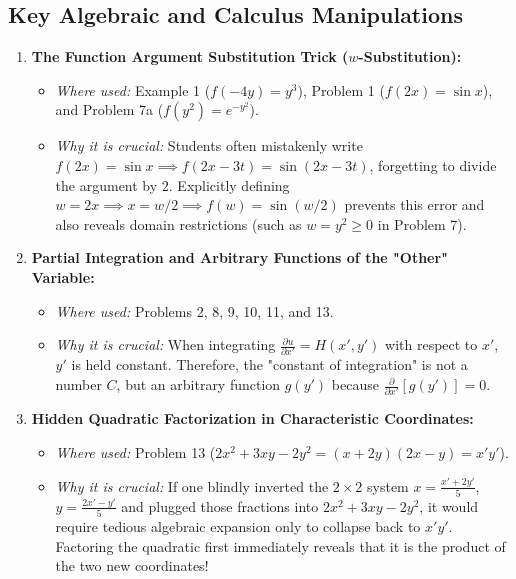 \documentclass[11pt]{article}
\begin{document}
\subsection{Key Algebraic and Calculus Manipulations}
\begin{enumerate}
    \item \textbf{The Function Argument Substitution Trick ($w$-Substitution):}
    \begin{itemize}
        \item \emph{Where used:} Example 1 ($f(-4y) = y^3$), Problem 1 ($f(2x) = \sin x$), and Problem 7a ($f(y^2) = e^{-y^2}$).
        \item \emph{Why it is crucial:} Students often mistakenly write $f(2x) = \sin x \implies f(2x - 3t) = \sin(2x - 3t)$, forgetting to divide the argument by $2$. Explicitly defining $w = 2x \implies x = w/2 \implies f(w) = \sin(w/2)$ prevents this error and also reveals domain restrictions (such as $w = y^2 \ge 0$ in Problem 7).
    \end{itemize}

    \item \textbf{Partial Integration and Arbitrary Functions of the "Other" Variable:}
    \begin{itemize}
        \item \emph{Where used:} Problems 2, 8, 9, 10, 11, and 13.
        \item \emph{Why it is crucial:} When integrating $\frac{\partial u}{\partial x'} = H(x', y')$ with respect to $x'$, $y'$ is held constant. Therefore, the "constant of integration" is not a number $C$, but an arbitrary function $g(y')$ because $\frac{\partial}{\partial x'}[g(y')] = 0$.
    \end{itemize}

    \item \textbf{Hidden Quadratic Factorization in Characteristic Coordinates:}
    \begin{itemize}
        \item \emph{Where used:} Problem 13 ($2x^2 + 3xy - 2y^2 = (x + 2y)(2x - y) = x'y'$).
        \item \emph{Why it is crucial:} If one blindly inverted the $2 \times 2$ system $x = \frac{x' + 2y'}{5}$, $y = \frac{2x' - y'}{5}$ and plugged those fractions into $2x^2 + 3xy - 2y^2$, it would require tedious algebraic expansion only to collapse back to $x'y'$. Factoring the quadratic first immediately reveals that it is the product of the two new coordinates!
    \end{itemize}


\end{enumerate}
\end{document}

